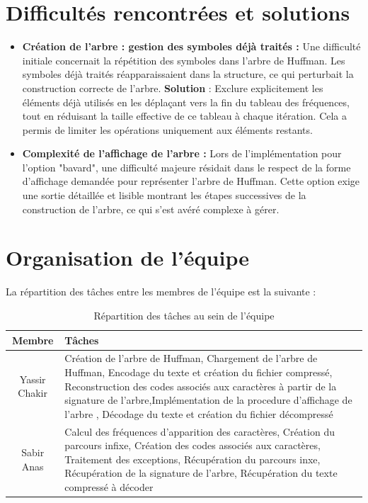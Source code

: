 \documentclass[12pt,a4paper]{article}
\begin{document}
\section{Difficultés rencontrées et solutions}
\begin{itemize}

    \item \textbf{Création de l'arbre : gestion des symboles déjà traités :} 
Une difficulté initiale concernait la répétition des symboles dans l’arbre de Huffman. Les symboles déjà traités réapparaissaient dans la structure, ce qui perturbait la construction correcte de l’arbre.
\textbf{Solution} : Exclure explicitement les éléments déjà utilisés en les déplaçant vers la fin du tableau des fréquences, tout en réduisant la taille effective de ce tableau à chaque itération. Cela a permis de limiter les opérations uniquement aux éléments restants.

    \item \textbf{Complexité de l’affichage de l’arbre :} Lors de l’implémentation pour l’option "bavard", une difficulté majeure résidait dans le respect de la forme d’affichage demandée pour représenter l’arbre de Huffman. Cette option exige une sortie détaillée et lisible montrant les étapes successives de la construction de l’arbre, ce qui s’est avéré complexe à gérer.
\end{itemize}

\section{Organisation de l'équipe}
La répartition des tâches entre les membres de l'équipe est la suivante :
\begin{table}[h!]
\centering
\begin{tabular}{|c|p{8cm}|} 
\hline
\textbf{Membre} & \textbf{Tâches} \\
\hline
Yassir Chakir & Création de l'arbre de Huffman, Chargement de l'arbre de Huffman, Encodage du texte et création du fichier compressé, Reconstruction des codes associés aux caractères à partir de la signature de l'arbre,Implémentation de la procedure d'affichage de l'arbre , Décodage du texte et création du fichier décompressé  \\
\hline
Sabir Anas & Calcul des fréquences d'apparition des caractères, Création du parcours infixe, Création des codes associés aux caractères, Traitement des exceptions, Récupération du parcours inxe, Récupération de la signature de l'arbre, Récupération du texte compressé à décoder \\
\hline
\end{tabular}
\caption{Répartition des tâches au sein de l'équipe}
\end{table}
\end{document}
